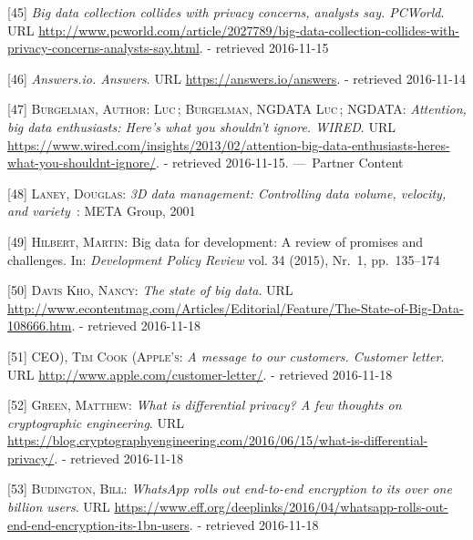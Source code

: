 \documentclass[12pt,english,a4paper,titlepage,cleardoublepage=empty,dottedtoc]{report}
\begin{document}
\hypertarget{ref-web_2013_big-data-collection-collides-with-privacy-concerns}{}
{[}45{]} \emph{Big data collection collides with privacy concerns,
analysts say. PCWorld}. URL
\url{http://www.pcworld.com/article/2027789/big-data-collection-collides-with-privacy-concerns-analysts-say.html}.
- retrieved 2016-11-15

\hypertarget{ref-web_2016_answers-io}{}
{[}46{]} \emph{Answers.io. Answers}. URL
\url{https://answers.io/answers}. - retrieved 2016-11-14

\hypertarget{ref-web_2016_big-data-enthusiasts-should-not-ignore}{}
{[}47{]} \textsc{Burgelman, Author: Luc}\,; \textsc{Burgelman, NGDATA
Luc}\,; \textsc{NGDATA}: \emph{Attention, big data enthusiasts: Here's
what you shouldn't ignore. WIRED}. URL
\url{https://www.wired.com/insights/2013/02/attention-big-data-enthusiasts-heres-what-you-shouldnt-ignore/}.
- retrieved 2016-11-15. ---~Partner Content

\hypertarget{ref-report_2001_3d-data-management-controlling-data-volume-velocity-and-variety}{}
{[}48{]} \textsc{Laney, Douglas}: \emph{3D data management: Controlling
data volume, velocity, and variety}~: META Group, 2001

\hypertarget{ref-paper_2015_big-data-for-development-a-review-of-promises-and-challenges:more-data}{}
{[}49{]} \textsc{Hilbert, Martin}: Big data for development: A review of
promises and challenges. In: \emph{Development Policy Review} vol. 34
(2015), Nr.~1, pp.~135--174

\hypertarget{ref-web_2016_the-state-of-big-data}{}
{[}50{]} \textsc{Davis Kho, Nancy}: \emph{The state of big data}. URL
\url{http://www.econtentmag.com/Articles/Editorial/Feature/The-State-of-Big-Data-108666.htm}.
- retrieved 2016-11-18

\hypertarget{ref-web_2016_apple_customer-letter}{}
{[}51{]} \textsc{CEO), Tim Cook (Apple's}: \emph{A message to our
customers. Customer letter}. URL
\url{http://www.apple.com/customer-letter/}. - retrieved 2016-11-18

\hypertarget{ref-web_2016_what-is-differential-privacy}{}
{[}52{]} \textsc{Green, Matthew}: \emph{What is differential privacy? A
few thoughts on cryptographic engineering}. URL
\url{https://blog.cryptographyengineering.com/2016/06/15/what-is-differential-privacy/}.
- retrieved 2016-11-18

\hypertarget{ref-web_2016_eff_whatsapp-rolls-out-emd-to-end-encryption}{}
{[}53{]} \textsc{Budington, Bill}: \emph{WhatsApp rolls out end-to-end
encryption to its over one billion users}. URL
\url{https://www.eff.org/deeplinks/2016/04/whatsapp-rolls-out-end-end-encryption-its-1bn-users}.
- retrieved 2016-11-18
\end{document}
